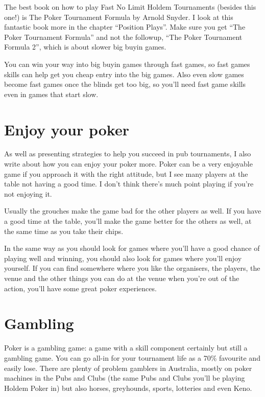 The best book on how to play Fast No Limit Holdem Tournaments
(besides this one!) is The Poker Tournament Formula by Arnold Snyder.
I look at this fantastic book more in the chapter ``Position Plays''.
Make sure you get ``The Poker Tournament Formula'' and not the followup,
``The Poker Tournament Formula 2'', which is about slower big buyin games.

You can win your way into big buyin games through fast games,
so fast games skills can help get you cheap entry into the big games.
Also even slow games become fast games once the blinds get too big,
so you'll need fast game skills even in games that start slow.

\section*{Enjoy your poker}

As well as presenting strategies to help you succeed
in pub tournaments,
I also write about how you can enjoy your poker
more. Poker can be a very enjoyable game if you approach
it with the right attitude, but I see many players at the table
not having a good time. I don't think there's much
point playing if you're not enjoying it.

Usually the grouches make the game bad for the other
players as well. If you have a good time at the table, you'll make the
game better for the others as well, at the same time as you take
their chips.

In the same way as you should look for games where you'll have
a good chance of playing well and winning, you should
also look for games where you'll enjoy yourself.
If you can find somewhere where you like
the organisers, the players, the venue and the other things
you can do at the venue when you're out of the action,
you'll have some great poker experiences.

\section*{Gambling}

Poker is a gambling
game: a game with a skill component certainly but still
a gambling game. You can go all-in for your tournament life
as a 70\% favourite and easily lose. There are plenty of problem gamblers
in Australia, mostly on poker machines in the Pubs and Clubs
(the same Pubs and Clubs you'll be playing Holdem Poker
in) but also horses, greyhounds, sports, lotteries and even Keno.

